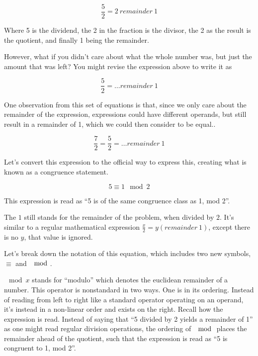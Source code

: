 \documentclass[index]{subfiles}
\begin{document}
\begin{equation*}
    \frac{5}{2}=2\ remainder\ 1
\end{equation*}

Where 5 is the dividend, the 2 in the fraction is the divisor, the 2 as the result is the quotient, and finally 1 being the remainder.

However, what if you didn't care about what the whole number was, but just the amount that was left? You might revise the expression above to write it as

\begin{equation*}
    \frac{5}{2}=\dots remainder\ 1
\end{equation*}

One observation from this set of equations is that, since we only care about the remainder of the expression, expressions could have different operands, but still result in a remainder of 1, which we could then consider to be equal..

\begin{equation*}
    \frac{7}{2}=\frac{5}{2}=\dots remainder\ 1
\end{equation*}

Let's convert this expression to the official way to express this, creating what is known as a congruence statement.

\begin{equation*}
    5\equiv 1 \mod 2
\end{equation*}

This expression is read as ``5 is of the same congruence class as 1, mod 2''.

The \(1\) still stands for the remainder of the problem, when divided by \(2\). It's similar to a regular mathematical expression \(\frac{x}{2}=y (remainder\ 1)\), except there is no \(y\), that value is ignored.

Let's break down the notation of this equation, which includes two new symbols, \(\equiv\) and \(\mod\).


\(\mod x\) stands for ``modulo'' which denotes the euclidean remainder of a number. This operator is nonstandard in two ways. One is in its ordering. Instead of reading from left to right like a standard operator operating on an operand, it's instead in a non-linear order and exists on the right. Recall how the expression is read. Instead of saying that ``5 divided by 2 yields a remainder of 1'' as one might read regular division operations, the ordering of \(\mod\) places the remainder ahead of the quotient, such that the expression is read as ``5 is congruent to 1, mod 2''.
\end{document}
